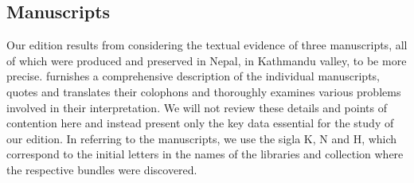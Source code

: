 
\subsection{Manuscripts}
Our edition results from considering the textual evidence of three manuscripts, all of which were produced and preserved in Nepal, in Kathmandu valley, to be more precise. \textcites[\S 
2.1]{kleb-2021b} furnishes a comprehensive description of the individual manuscripts, quotes and translates their colophons and thoroughly examines various problems involved in their interpretation. We will not review these details and points of contention here and instead present only the key data essential for the study of our edition.  
In referring to the manuscripts, we use the sigla K, N and H, which correspond to the initial letters in the names of the libraries and collection where the respective bundles were discovered.

